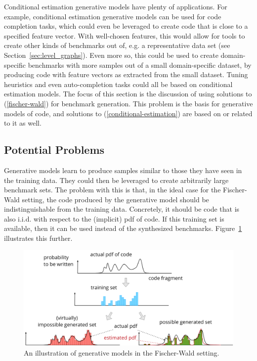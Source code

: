 Conditional estimation generative models have plenty of applications.
For example, conditional estimation generative models can be used for code completion tasks, which could even be leveraged to create code that is close to a specified feature vector.
With well-chosen features, this would allow for tools to create other kinds of benchmarks out of, e.g. a representative data set (see Section~\ref{sec:level_graphs}). 
Even more so, this could be used to create domain-specific benchmarks with more samples out of a small domain-specific dataset, by producing code with feature vectors as extracted from the small dataset.
Tuning heuristics and even auto-completion tasks could all be based on conditional estimation models.
The focus of this section is the discussion of using solutions to (\ref{fischer-wald}) for benchmark generation.
This problem is the basis for generative models of code, and solutions to (\ref{conditional-estimation}) are based on or related to it as well.

\subsection{Potential Problems}
\label{sec:potential_problems}
Generative models learn to produce samples similar to those they have seen in the training data. They could then be leveraged to create arbitrarily large benchmark sets.
The problem with this is that, in the ideal case for the Fischer-Wald setting, the code produced by the generative model should be indistinguishable from the training data.
Concretely, it should be code that is also \acs{i.i.d.} with respect to the (implicit) \ac{pdf} of code.
If this training set is available, then it can be used instead of the synthesized benchmarks.
Figure~\ref{fig:histograms} illustrates this further.

\begin{figure}[h]
	\centering
	\includegraphics[width=\textwidth]{figures/illustration_histograms_ideal.pdf}
	\caption{An illustration of generative models in the Fischer-Wald setting.}
	\label{fig:histograms}
\end{figure}

